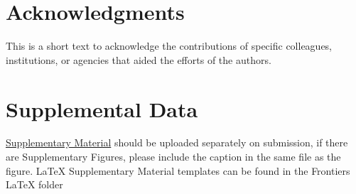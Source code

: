 \documentclass[utf8]{frontiersSCNS} %
\begin{document}
\section*{Acknowledgments}
This is a short text to acknowledge the contributions of specific colleagues, institutions, or agencies that aided the efforts of the authors.

\section*{Supplemental Data}
 \href{http://home.frontiersin.org/about/author-guidelines#SupplementaryMaterial}{Supplementary Material} should be uploaded separately on submission, if there are Supplementary Figures, please include the caption in the same file as the figure. LaTeX Supplementary Material templates can be found in the Frontiers LaTeX folder 




\end{document}
